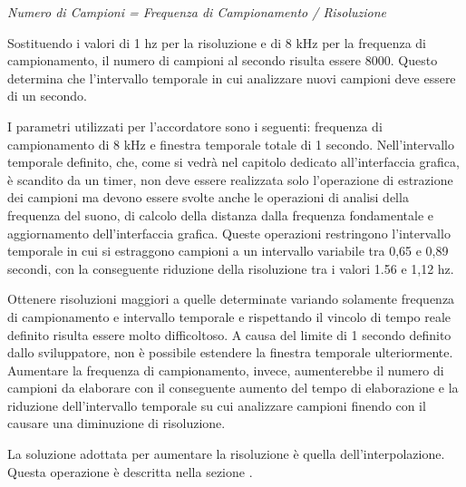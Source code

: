 \vspace{0.2cm}
\centerline{\textit{Numero di Campioni = Frequenza di Campionamento / Risoluzione}}
\vspace{0.2cm}

Sostituendo i valori di 1 hz per la risoluzione e di 8 kHz per la frequenza di campionamento, il numero di campioni al secondo risulta essere 8000. 
Questo determina che l'intervallo temporale in cui analizzare nuovi campioni deve essere di un secondo.

I parametri utilizzati per l'accordatore sono i seguenti: frequenza di campionamento di 8 kHz e finestra temporale totale di 1 secondo. 
Nell'intervallo temporale definito, che, come si vedrà nel capitolo dedicato all'interfaccia grafica, è scandito da un timer, non deve essere realizzata solo l'operazione di estrazione dei campioni ma devono essere svolte anche le operazioni di analisi della frequenza del suono, di calcolo della distanza dalla frequenza fondamentale e aggiornamento dell'interfaccia grafica. 
Queste operazioni restringono l'intervallo temporale in cui si estraggono campioni a un intervallo variabile tra 0,65 e 0,89 secondi, con la conseguente riduzione della risoluzione tra i valori 1.56 e 1,12 hz.

Ottenere risoluzioni maggiori a quelle determinate variando solamente frequenza di campionamento e intervallo temporale e rispettando il vincolo di tempo reale definito risulta essere molto difficoltoso. 
A causa del limite di 1 secondo definito dallo sviluppatore, non è possibile estendere la finestra temporale ulteriormente.
Aumentare la frequenza di campionamento, invece, aumenterebbe il numero di campioni da elaborare con il conseguente aumento del tempo di elaborazione e la riduzione dell'intervallo temporale su cui analizzare campioni finendo con il causare una diminuzione di risoluzione.

La soluzione adottata per aumentare la risoluzione è quella dell'interpolazione.
Questa operazione è descritta nella sezione .

